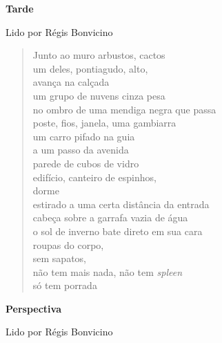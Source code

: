 \pagebreak

\textbf{Tarde}

Lido por Régis Bonvicino

\begin{verse}
Junto ao muro arbustos, cactos\\
um deles, pontiagudo, alto,\\
avança na calçada\\
um grupo de nuvens cinza pesa\\
no ombro de uma mendiga negra que passa\\
poste, fios, janela, uma gambiarra\\
um carro pifado na guia\\
a um passo da avenida\\
parede de cubos de vidro\\
edifício, canteiro de espinhos,\\
dorme\\
estirado a uma certa distância da entrada\\
cabeça sobre a garrafa vazia de água\\
o sol de inverno bate direto em sua cara\\
roupas do corpo,\\
sem sapatos,\\
não tem mais nada, não tem \emph{spleen}\\
só tem porrada
\end{verse}

\pagebreak

\textbf{Perspectiva}

Lido por Régis Bonvicino

